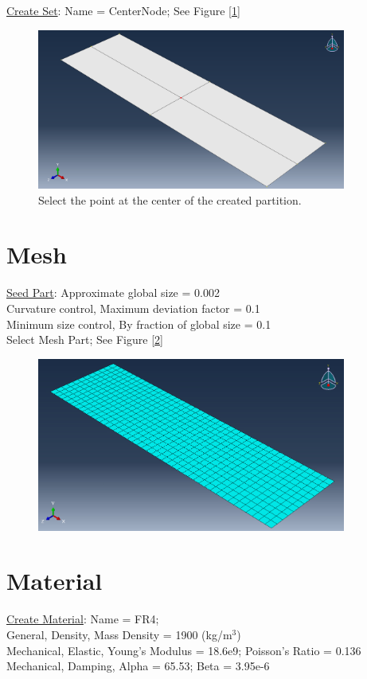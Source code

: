 \documentclass{article}
\begin{document}
	\underline{Create Set}: Name = CenterNode; See Figure [\ref{fig:CenterNode}]
	\begin{figure}[H]
		\centering
		\includegraphics[width=4in]{Figures/CenterNode.png}
		\caption{Select the point at the center of the created partition.}
		\label{fig:CenterNode}
	\end{figure}
	
	\section{Mesh}
	\underline{Seed Part}: Approximate global size = 0.002\\
	Curvature control, Maximum deviation factor = 0.1\\
	Minimum size control, By fraction of global size = 0.1\\
	
	Select Mesh Part; See Figure [\ref{fig:mesh}]
	\begin{figure}[H]
		\centering
		\includegraphics[width=4in]{Figures/mesh.png}
		\caption{}
		\label{fig:mesh}
	\end{figure}
	
	\section{Material}
	\underline{Create Material}: Name = FR4;\\
	General, Density, Mass Density = 1900 (kg/m$^3$)\\
	Mechanical, Elastic, Young's Modulus = 18.6e9; Poisson's Ratio = 0.136\\
	Mechanical, Damping, Alpha = 65.53; Beta = 3.95e-6
	
\end{document}
